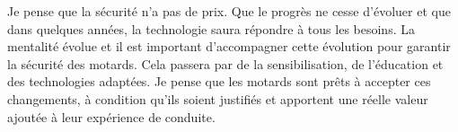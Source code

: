 
Je pense que la sécurité n'a pas de prix. Que le progrès ne cesse d'évoluer et que dans quelques années, la technologie saura répondre à tous les besoins. La mentalité évolue et il est important d'accompagner cette évolution pour garantir la sécurité des motards. Cela passera par de la sensibilisation, de l'éducation et des technologies adaptées. Je pense que les motards sont prêts à accepter ces changements, à condition qu'ils soient justifiés et apportent une réelle valeur ajoutée à leur expérience de conduite.